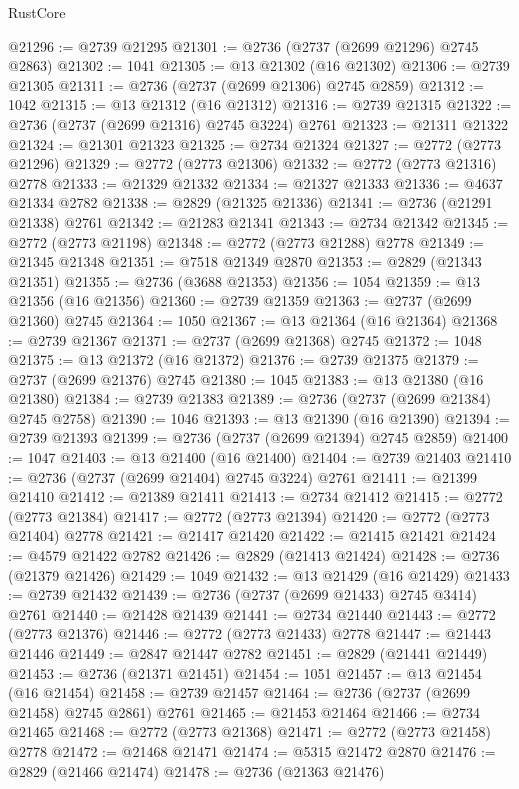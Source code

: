 \begin{lexlean}{RustCore}
\begin{coremodule}
@21296 := @2739 @21295
@21301 := @2736 (@2737 (@2699 @21296) @2745 @2863)
@21302 := 1041
@21305 := @13 @21302 (@16 @21302)
@21306 := @2739 @21305
@21311 := @2736 (@2737 (@2699 @21306) @2745 @2859)
@21312 := 1042
@21315 := @13 @21312 (@16 @21312)
@21316 := @2739 @21315
@21322 := @2736 (@2737 (@2699 @21316) @2745 @3224) @2761
@21323 := @21311 @21322
@21324 := @21301 @21323
@21325 := @2734 @21324
@21327 := @2772 (@2773 @21296)
@21329 := @2772 (@2773 @21306)
@21332 := @2772 (@2773 @21316) @2778
@21333 := @21329 @21332
@21334 := @21327 @21333
@21336 := @4637 @21334 @2782
@21338 := @2829 (@21325 @21336)
@21341 := @2736 (@21291 @21338) @2761
@21342 := @21283 @21341
@21343 := @2734 @21342
@21345 := @2772 (@2773 @21198)
@21348 := @2772 (@2773 @21288) @2778
@21349 := @21345 @21348
@21351 := @7518 @21349 @2870
@21353 := @2829 (@21343 @21351)
@21355 := @2736 (@3688 @21353)
@21356 := 1054
@21359 := @13 @21356 (@16 @21356)
@21360 := @2739 @21359
@21363 := @2737 (@2699 @21360) @2745
@21364 := 1050
@21367 := @13 @21364 (@16 @21364)
@21368 := @2739 @21367
@21371 := @2737 (@2699 @21368) @2745
@21372 := 1048
@21375 := @13 @21372 (@16 @21372)
@21376 := @2739 @21375
@21379 := @2737 (@2699 @21376) @2745
@21380 := 1045
@21383 := @13 @21380 (@16 @21380)
@21384 := @2739 @21383
@21389 := @2736 (@2737 (@2699 @21384) @2745 @2758)
@21390 := 1046
@21393 := @13 @21390 (@16 @21390)
@21394 := @2739 @21393
@21399 := @2736 (@2737 (@2699 @21394) @2745 @2859)
@21400 := 1047
@21403 := @13 @21400 (@16 @21400)
@21404 := @2739 @21403
@21410 := @2736 (@2737 (@2699 @21404) @2745 @3224) @2761
@21411 := @21399 @21410
@21412 := @21389 @21411
@21413 := @2734 @21412
@21415 := @2772 (@2773 @21384)
@21417 := @2772 (@2773 @21394)
@21420 := @2772 (@2773 @21404) @2778
@21421 := @21417 @21420
@21422 := @21415 @21421
@21424 := @4579 @21422 @2782
@21426 := @2829 (@21413 @21424)
@21428 := @2736 (@21379 @21426)
@21429 := 1049
@21432 := @13 @21429 (@16 @21429)
@21433 := @2739 @21432
@21439 := @2736 (@2737 (@2699 @21433) @2745 @3414) @2761
@21440 := @21428 @21439
@21441 := @2734 @21440
@21443 := @2772 (@2773 @21376)
@21446 := @2772 (@2773 @21433) @2778
@21447 := @21443 @21446
@21449 := @2847 @21447 @2782
@21451 := @2829 (@21441 @21449)
@21453 := @2736 (@21371 @21451)
@21454 := 1051
@21457 := @13 @21454 (@16 @21454)
@21458 := @2739 @21457
@21464 := @2736 (@2737 (@2699 @21458) @2745 @2861) @2761
@21465 := @21453 @21464
@21466 := @2734 @21465
@21468 := @2772 (@2773 @21368)
@21471 := @2772 (@2773 @21458) @2778
@21472 := @21468 @21471
@21474 := @5315 @21472 @2870
@21476 := @2829 (@21466 @21474)
@21478 := @2736 (@21363 @21476)

\end{coremodule}
\end{lexlean}
